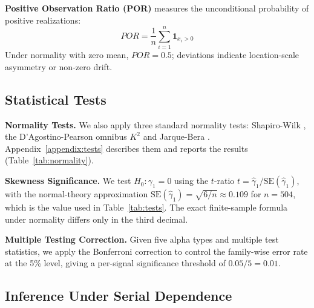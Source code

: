 \documentclass[11pt]{article}
\begin{document}
\textbf{Positive Observation Ratio (POR)} measures the unconditional probability of positive realizations:
\begin{equation}
    POR = \frac{1}{n} \sum_{i=1}^{n} \mathbf{1}_{x_i > 0}
\end{equation}
Under normality with zero mean, $POR = 0.5$; deviations indicate location-scale asymmetry or non-zero drift.

\subsection{Statistical Tests}
\label{sec:stattests}

\textbf{Normality Tests.} We also apply three standard normality tests: Shapiro-Wilk \citep{shapiro1965analysis}, the D'Agostino-Pearson omnibus $K^2$ \citep{dagostino1990suggestion} and Jarque-Bera \citep{jarque1980efficient}. Appendix~\ref{appendix:tests} describes them and reports the results (Table~\ref{tab:normality}).

\textbf{Skewness Significance.} We test $H_0: \gamma_1 = 0$ using the $t$-ratio $t = \hat{\gamma}_1 / \text{SE}(\hat{\gamma}_1)$, with the normal-theory approximation $\text{SE}(\hat{\gamma}_1) = \sqrt{6/n} \approx 0.109$ for $n = 504$, which is the value used in Table~\ref{tab:tests}. The exact finite-sample formula under normality differs only in the third decimal.

\textbf{Multiple Testing Correction.} Given five alpha types and multiple test statistics, we apply the Bonferroni correction to control the family-wise error rate at the 5\% level, giving a per-signal significance threshold of $0.05/5 = 0.01$.

\subsection{Inference Under Serial Dependence}
\label{sec:inference}
\end{document}
